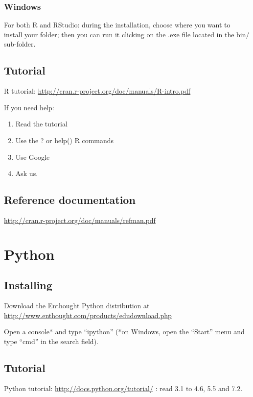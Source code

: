 \documentclass[a4paper,11pt]{article}
\begin{document}
\subsubsection{Windows}
For both R and RStudio: during the installation, choose where you want to install your folder; then you can run it clicking on the .exe file located in the bin/ sub-folder. 

\subsection{Tutorial}
R tutorial: \url{http://cran.r-project.org/doc/manuals/R-intro.pdf}
    
If you need help:
\begin{enumerate}
\item Read the tutorial
\item Use the ? or help() R commands
\item Use Google
\item Ask us.
\end{enumerate}

\subsection{Reference documentation}
\url{http://cran.r-project.org/doc/manuals/refman.pdf}


\section{Python}

\subsection{Installing}
Download the Enthought Python distribution at \url{http://www.enthought.com/products/edudownload.php}

Open a console* and type ``ipython''
(*on Windows, open the ``Start'' menu and type ``cmd'' in the search field).

\subsection{Tutorial}
Python tutorial: \url{http://docs.python.org/tutorial/} : read 3.1 to 4.6, 5.5 and 7.2.
\end{document}

